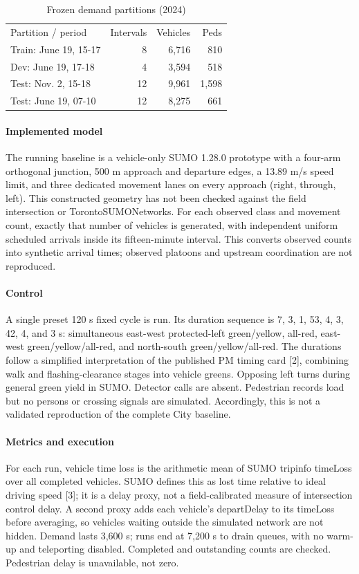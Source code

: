 \documentclass[conference]{IEEEtran}
\begin{document}
\begin{table}[ht]
\centering\footnotesize
\caption{Frozen demand partitions (2024)}
\begin{tabular}{lrrr}\hline
Partition / period & Intervals & Vehicles & Peds \\
Train: June 19, 15-17 & 8 & 6,716 & 810 \\
Dev: June 19, 17-18 & 4 & 3,594 & 518 \\
Test: Nov. 2, 15-18 & 12 & 9,961 & 1,598 \\
Test: June 19, 07-10 & 12 & 8,275 & 661 \\
\hline\end{tabular}
\end{table}
\paragraph{Implemented model} The running baseline is a vehicle-only SUMO 1.28.0 prototype with a four-arm orthogonal junction, 500 m approach and departure edges, a 13.89 m/s speed limit, and three dedicated movement lanes on every approach (right, through, left). This constructed geometry has not been checked against the field intersection or TorontoSUMONetworks. For each observed class and movement count, exactly that number of vehicles is generated, with independent uniform scheduled arrivals inside its fifteen-minute interval. This converts observed counts into synthetic arrival times; observed platoons and upstream coordination are not reproduced.

\paragraph{Control} A single preset 120 s fixed cycle is run. Its duration sequence is 7, 3, 1, 53, 4, 3, 42, 4, and 3 s: simultaneous east-west protected-left green/yellow, all-red, east-west green/yellow/all-red, and north-south green/yellow/all-red. The durations follow a simplified interpretation of the published PM timing card [2], combining walk and flashing-clearance stages into vehicle greens. Opposing left turns during general green yield in SUMO. Detector calls are absent. Pedestrian records load but no persons or crossing signals are simulated. Accordingly, this is not a validated reproduction of the complete City baseline.

\paragraph{Metrics and execution} For each run, vehicle time loss is the arithmetic mean of SUMO tripinfo timeLoss over all completed vehicles. SUMO defines this as lost time relative to ideal driving speed [3]; it is a delay proxy, not a field-calibrated measure of intersection control delay. A second proxy adds each vehicle's departDelay to its timeLoss before averaging, so vehicles waiting outside the simulated network are not hidden. Demand lasts 3,600 s; runs end at 7,200 s to drain queues, with no warm-up and teleporting disabled. Completed and outstanding counts are checked. Pedestrian delay is unavailable, not zero.
\end{document}
